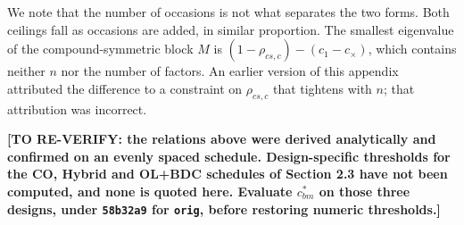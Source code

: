 \documentclass[
  11pt,
]{article}
\newcounter{none} %
\begin{document}
We note that the number of occasions is not what separates the two
forms. Both ceilings fall as occasions are added, in similar
proportion. The smallest eigenvalue of the compound-symmetric block
\(M\) is \((1-\rho_{cs,c}) - (c_1 - c_{\times})\), which contains neither \(n\)
nor the number of factors. An earlier version of this appendix
attributed the difference to a constraint on \(\rho_{cs,c}\) that tightens
with \(n\); that attribution was incorrect.

\textbf{[TO RE-VERIFY: the relations above were derived analytically
and confirmed on an evenly spaced schedule. Design-specific
thresholds for the CO, Hybrid and OL+BDC schedules of Section 2.3
have not been computed, and none is quoted here. Evaluate
$c_{bm}^{\ast}$ on those three designs, under
\texttt{58b32a9} for \texttt{orig}, before restoring numeric
thresholds.]}
\end{document}

